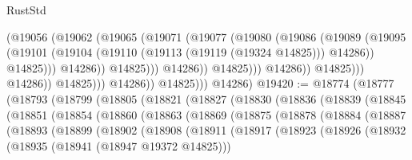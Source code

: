 \begin{lexlean}{RustStd}
\begin{coremodule}
                                          (@19056
                                            (@19062
                                              (@19065
                                                (@19071
                                                  (@19077
                                                    (@19080
                                                      (@19086
                                                        (@19089
                                                          (@19095
                                                            (@19101
                                                              (@19104
                                                                (@19110
                                                                  (@19113 (@19119 (@19324 @14825)))
                                                                  @14286))
                                                              @14825)))
                                                        @14286))
                                                    @14825)))
                                              @14286))
                                          @14825)))
                                    @14286))
                                @14825)))
                          @14286))
                      @14825)))
                @14286))
            @14825)))
      @14286)
@19420 := @18774
    (@18777
      (@18793
        (@18799
          (@18805
            (@18821
              (@18827
                (@18830
                  (@18836
                    (@18839
                      (@18845
                        (@18851
                          (@18854
                            (@18860
                              (@18863
                                (@18869
                                  (@18875
                                    (@18878
                                      (@18884
                                        (@18887
                                          (@18893
                                            (@18899
                                              (@18902
                                                (@18908
                                                  (@18911
                                                    (@18917
                                                      (@18923
                                                        (@18926
                                                          (@18932
                                                            (@18935 (@18941 (@18947 @19372 @14825)))

\end{coremodule}
\end{lexlean}
